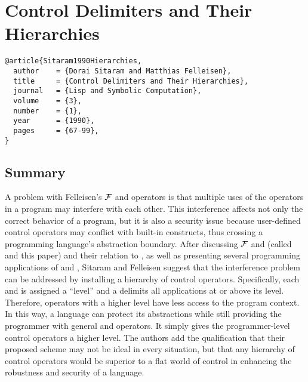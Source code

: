 \documentclass[letterpaper]{llncs}
\begin{document}
\section*{Control Delimiters and Their Hierarchies}%

\begin{verbatim}
@article{Sitaram1990Hierarchies,
  author    = {Dorai Sitaram and Matthias Felleisen},
  title     = {Control Delimiters and Their Hierarchies},
  journal   = {Lisp and Symbolic Computation},
  volume    = {3},
  number    = {1},
  year      = {1990},
  pages     = {67-99},
}
\end{verbatim}


\subsection*{Summary}
A problem with Felleisen's $ \mathcal{F} $ and \prompt operators is that multiple uses of the operators in a program may interfere with each other. This interference affects not only the correct behavior of a program, but it is also a security issue because user-defined control operators may conflict with built-in constructs, thus crossing a programming language's abstraction boundary. After discussing $ \mathcal{F} $ and \prompt (called \ctrl and \run this paper) and their relation to \callcc, as well as presenting several programming applications of \ctrl and \run, Sitaram and Felleisen suggest that the interference problem can be addressed by installing a hierarchy of control operators. Specifically, each \ctrl and \run is assigned a ``level'' and a \run delimits all \ctrl applications at or above its level. Therefore, operators with a higher level have less access to the program context. In this way, a language can protect its abstractions while still providing the programmer with general \ctrl and \run operators. It simply gives the programmer-level control operators a higher level. The authors add the qualification that their proposed scheme may not be ideal in every situation, but that any hierarchy of control operators would be superior to a flat world of control in enhancing the robustness and security of a language.
\end{document}
